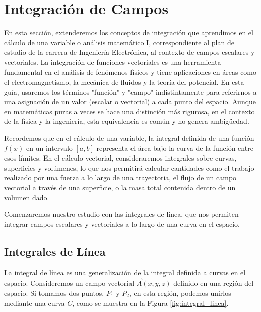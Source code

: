 \documentclass{article}
\begin{document}
\section{Integración de Campos}

En esta sección, extenderemos los conceptos de integración que aprendimos en el cálculo de una variable o análisis matemático I, correspondiente al plan de estudio de la carrera de Ingeniería Electrónica, al contexto de campos escalares y vectoriales. La integración de funciones vectoriales es una herramienta fundamental en el análisis de fenómenos físicos y tiene aplicaciones en áreas como el electromagnetismo, la mecánica de fluidos y la teoría del potencial. En esta guía, usaremos los términos "función" y "campo" indistintamente para referirnos a una asignación de un valor (escalar o vectorial) a cada punto del espacio. Aunque en matemáticas puras a veces se hace una distinción más rigurosa, en el contexto de la física y la ingeniería, esta equivalencia es común y no genera ambigüedad.

Recordemos que en el cálculo de una variable, la integral definida de una función $f(x)$ en un intervalo $[a, b]$ representa el área bajo la curva de la función entre esos límites. En el cálculo vectorial, consideraremos integrales sobre curvas, superficies y volúmenes, lo que nos permitirá calcular cantidades como el trabajo realizado por una fuerza a lo largo de una trayectoria, el flujo de un campo vectorial a través de una superficie, o la masa total contenida dentro de un volumen dado.

Comenzaremos nuestro estudio con las integrales de línea, que nos permiten integrar campos escalares y vectoriales a lo largo de una curva en el espacio.

\subsection{Integrales de Línea}

La integral de línea es una generalización de la integral definida a curvas en el espacio. Consideremos un campo vectorial $\vec{A}(x,y,z)$ definido en una región del espacio. Si tomamos dos puntos, $P_1$ y $P_2$, en esta región, podemos unirlos mediante una curva $C$, como se muestra en la Figura \ref{fig:integral_linea}.
\end{document}
